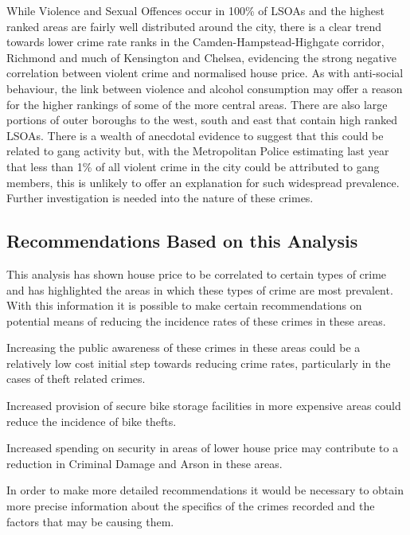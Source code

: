 \documentclass{article}
\begin{document}
While Violence and Sexual Offences occur in 100\% of LSOAs and the highest ranked areas are fairly well distributed around the city, there is a clear trend towards lower crime rate ranks in the Camden-Hampstead-Highgate corridor, Richmond and much of Kensington and Chelsea, evidencing the strong negative correlation between violent crime and normalised house price. As with anti-social behaviour, the link between violence and alcohol consumption may offer a reason for the higher rankings of some of the more central areas. There are also large portions of outer boroughs to the west, south and east that contain high ranked LSOAs. There is a wealth of anecdotal evidence to suggest that this could be related to gang activity but, with the Metropolitan Police estimating last year that less than 1\% of all violent crime in the city could be attributed to gang members, this is unlikely to offer an explanation for such widespread prevalence. Further investigation is needed into the nature of these crimes.

\subsection{Recommendations Based on this Analysis}
This analysis has shown house price to be correlated to certain types of crime and has highlighted the areas in which these types of crime are most prevalent. With this information it is possible to make certain recommendations on potential means of reducing the incidence rates of these crimes in these areas.
\newline 

Increasing the public awareness of these crimes in these areas could be a relatively low cost initial step towards reducing crime rates, particularly in the cases of theft related crimes.
\newline 

Increased provision of secure bike storage facilities in more expensive areas could reduce the incidence of bike thefts.
\newline 

Increased spending on security in areas of lower house price may contribute to a reduction in Criminal Damage and Arson in these areas.
\newline 

In order to make more detailed recommendations it would be necessary to obtain more precise information about the specifics of the crimes recorded and the factors that may be causing them.
\newline 
\end{document}
